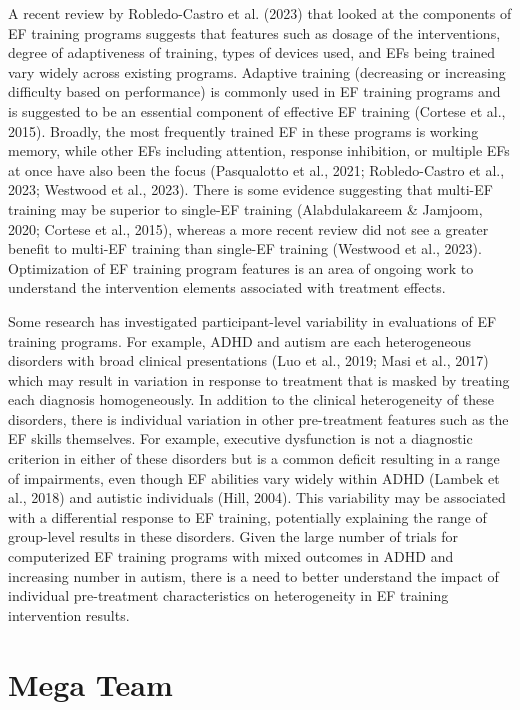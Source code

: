 \documentclass[
  letterpaper,
]{ut-thesis}
\begin{document}
A recent review by Robledo-Castro et al. (2023) that looked at the
components of EF training programs suggests that features such as dosage
of the interventions, degree of adaptiveness of training, types of
devices used, and EFs being trained vary widely across existing
programs. Adaptive training (decreasing or increasing difficulty based
on performance) is commonly used in EF training programs and is
suggested to be an essential component of effective EF training (Cortese
et al., 2015). Broadly, the most frequently trained EF in these programs
is working memory, while other EFs including attention, response
inhibition, or multiple EFs at once have also been the focus
(Pasqualotto et al., 2021; Robledo-Castro et al., 2023; Westwood et al.,
2023). There is some evidence suggesting that multi-EF training may be
superior to single-EF training (Alabdulakareem \& Jamjoom, 2020; Cortese
et al., 2015), whereas a more recent review did not see a greater
benefit to multi-EF training than single-EF training (Westwood et al.,
2023). Optimization of EF training program features is an area of
ongoing work to understand the intervention elements associated with
treatment effects.

Some research has investigated participant-level variability in
evaluations of EF training programs. For example, ADHD and autism are
each heterogeneous disorders with broad clinical presentations (Luo et
al., 2019; Masi et al., 2017) which may result in variation in response
to treatment that is masked by treating each diagnosis homogeneously. In
addition to the clinical heterogeneity of these disorders, there is
individual variation in other pre-treatment features such as the EF
skills themselves. For example, executive dysfunction is not a
diagnostic criterion in either of these disorders but is a common
deficit resulting in a range of impairments, even though EF abilities
vary widely within ADHD (Lambek et al., 2018) and autistic individuals
(Hill, 2004). This variability may be associated with a differential
response to EF training, potentially explaining the range of group-level
results in these disorders. Given the large number of trials for
computerized EF training programs with mixed outcomes in ADHD and
increasing number in autism, there is a need to better understand the
impact of individual pre-treatment characteristics on heterogeneity in
EF training intervention results.

\section{Mega Team}\label{mega-team}
\end{document}
